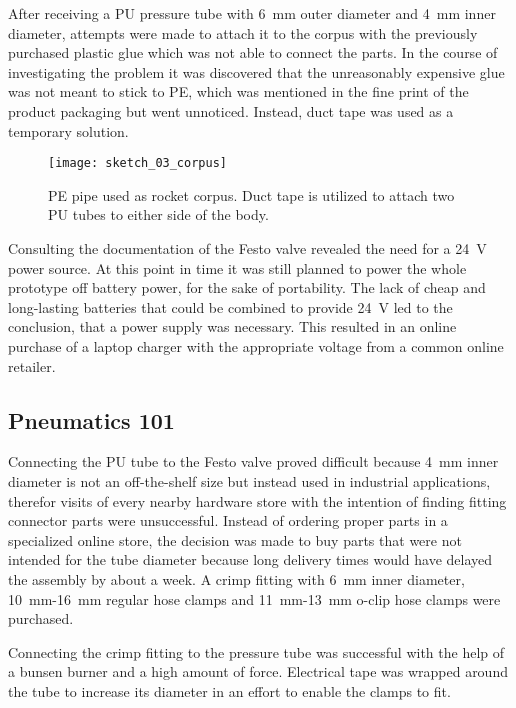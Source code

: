 After receiving a PU pressure tube with \SI{6}{\milli\meter} outer diameter and \SI{4}{\milli\meter} inner diameter, attempts were made to attach it to the corpus with the previously purchased plastic glue which was not able to connect the parts. In the course of investigating the problem it was discovered that the unreasonably expensive glue was not meant to stick to PE, which was mentioned in the fine print of the product packaging but went unnoticed. Instead, duct tape was used as a temporary solution. 

\begin{figure}[h]
\centering

\texttt{[image: sketch\_03\_corpus]}

\caption{PE pipe used as rocket corpus. Duct tape is utilized to attach two PU tubes to either side of the body.}
\end{figure}

Consulting the documentation of the Festo valve revealed the need for a \SI{24}{\volt} power source. At this point in time it was still planned to power the whole prototype off battery power, for the sake of portability. The lack of cheap and long-lasting batteries that could be combined to provide \SI{24}{\volt} led to the conclusion, that a power supply was necessary. This resulted in an online purchase of a laptop charger \cite{power-supply} with the appropriate voltage from a common online retailer.

\subsection{Pneumatics 101}
Connecting the PU tube to the Festo valve proved difficult because \SI{4}{\milli\meter} inner diameter is not an off-the-shelf size but instead used in industrial applications, therefor visits of every nearby hardware store with the intention of finding fitting connector parts were unsuccessful. Instead of ordering proper parts in a specialized online store, the decision was made to buy parts that were not intended for the tube diameter because long delivery times would have delayed the assembly by about a week. A crimp fitting with \SI{6}{\milli\meter} inner diameter, \SI{10}{\milli\meter}-\SI{16}{\milli\meter} regular hose clamps and \SI{11}{\milli\meter}-\SI{13}{\milli\meter} o-clip hose clamps were purchased. 

Connecting the crimp fitting to the pressure tube was successful with the help of a bunsen burner and a high amount of force. Electrical tape was wrapped around the tube to increase its diameter in an effort to enable the clamps to fit.

